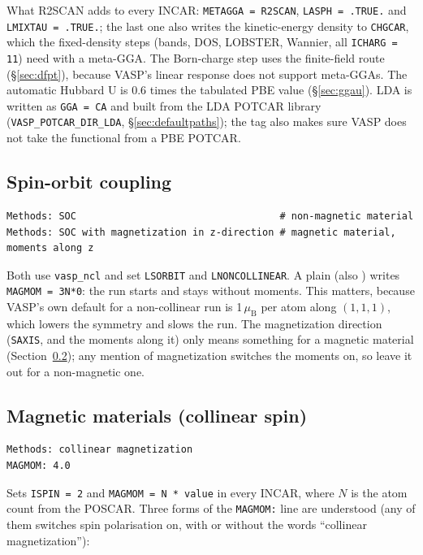 \documentclass[11pt,a4paper]{scrartcl}
\newcommand{\cmd}[1]{\texttt{\detokenize{#1}}}
\begin{document}
What R2SCAN adds to every INCAR: \texttt{METAGGA = R2SCAN}, \texttt{LASPH = .TRUE.} and
\texttt{LMIXTAU = .TRUE.}; the last one also writes the kinetic-energy density to
\texttt{CHGCAR}, which the fixed-density steps (bands, DOS, LOBSTER, Wannier, all
\texttt{ICHARG = 11}) need with a meta-GGA.  The Born-charge step uses the finite-field route
(\S\ref{sec:dfpt}), because VASP's linear response does not support meta-GGAs.  The automatic
Hubbard U is 0.6 times the tabulated PBE value (\S\ref{sec:ggau}).  LDA is written as
\texttt{GGA = CA} and built from the LDA POTCAR library (\texttt{VASP\_POTCAR\_DIR\_LDA},
\S\ref{sec:defaultpaths}); the tag also makes sure VASP does not take the functional from a
PBE POTCAR.

\subsection{Spin-orbit coupling}

\begin{lstlisting}
Methods: SOC                                   # non-magnetic material
Methods: SOC with magnetization in z-direction # magnetic material, moments along z
\end{lstlisting}

Both use \texttt{vasp\_ncl} and set \texttt{LSORBIT} and \texttt{LNONCOLLINEAR}.  A plain
\cmd{SOC} (also \cmd{SOC, non-magnetic}) writes \texttt{MAGMOM = 3N*0}: the run starts and
stays without moments.  This matters, because VASP's own default for a non-collinear run is
1\,$\mu_{\mathrm{B}}$ per atom along $(1,1,1)$, which lowers the symmetry and slows the run.
The magnetization direction (\texttt{SAXIS}, and the moments along it) only means something
for a magnetic material (Section~\ref{sec:magnetic}); any mention of magnetization switches the
moments on, so leave it out for a non-magnetic one.

\subsection{Magnetic materials (collinear spin)}
\label{sec:magnetic}

\begin{lstlisting}
Methods: collinear magnetization
MAGMOM: 4.0
\end{lstlisting}

Sets \texttt{ISPIN = 2} and \texttt{MAGMOM = N * value} in every INCAR,
where $N$ is the atom count from the POSCAR.  Three forms of the
\texttt{MAGMOM:} line are understood (any of them switches spin polarisation
on, with or without the words ``collinear magnetization''):
\end{document}
